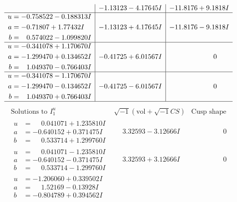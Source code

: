 \documentclass[1p]{elsarticle_modified}
\theoremstyle{definition}
\newcommand{\I}{\sqrt{-1}}
\begin{document}
$$\begin{array}{c|c|c}
 & -1.13123 - 4.17645 I & -11.8176 + 9.1818 I \\ \hline\begin{aligned}
u &= -0.758522 - 0.188313 I \\
a &= -0.71807 + 1.77432 I \\
b &= \phantom{-}0.574022 - 1.099820 I\end{aligned}
 & -1.13123 + 4.17645 I & -11.8176 - 9.1818 I \\ \hline\begin{aligned}
u &= -0.341078 + 1.170670 I \\
a &= -1.299470 + 0.134652 I \\
b &= \phantom{-}1.049370 - 0.766403 I\end{aligned}
 & -0.41725 + 6.01567 I & \phantom{-0.000000 } 0 \\ \hline\begin{aligned}
u &= -0.341078 - 1.170670 I \\
a &= -1.299470 - 0.134652 I \\
b &= \phantom{-}1.049370 + 0.766403 I\end{aligned}
 & -0.41725 - 6.01567 I & \phantom{-0.000000 } 0\\
 \hline 
 \end{array}$$\newpage$$\begin{array}{c|c|c}  
\text{Solutions to }I^u_{1}& \I (\text{vol} + \sqrt{-1}CS) & \text{Cusp shape}\\
 \hline 
\begin{aligned}
u &= \phantom{-}0.041071 + 1.235810 I \\
a &= -0.640152 + 0.371475 I \\
b &= \phantom{-}0.533714 + 1.299760 I\end{aligned}
 & \phantom{-}3.32593 - 3.12666 I & \phantom{-0.000000 } 0 \\ \hline\begin{aligned}
u &= \phantom{-}0.041071 - 1.235810 I \\
a &= -0.640152 - 0.371475 I \\
b &= \phantom{-}0.533714 - 1.299760 I\end{aligned}
 & \phantom{-}3.32593 + 3.12666 I & \phantom{-0.000000 } 0 \\ \hline\begin{aligned}
u &= -1.206060 + 0.339502 I \\
a &= \phantom{-}1.52169 - 0.13928 I \\
b &= -0.804789 + 0.394562 I\end{aligned}

\end{array}$$
\end{document}
